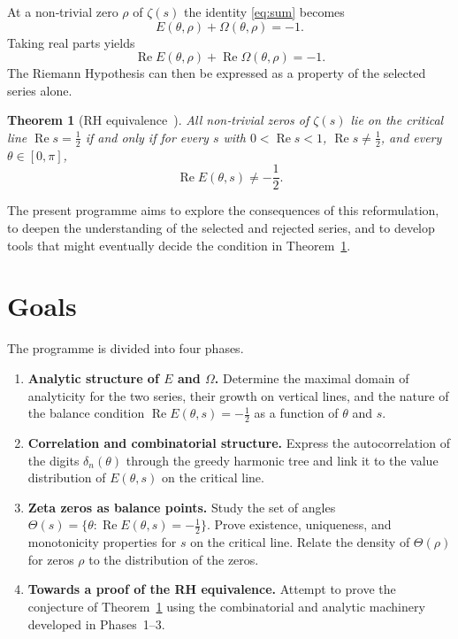 \documentclass[11pt,a4paper]{article}
\newtheorem{theorem}{Theorem}[section]
\theoremstyle{definition}
\theoremstyle{remark}
\begin{document}
At a non‑trivial zero \(\rho\) of \(\zeta(s)\) the identity \eqref{eq:sum} becomes
\[
E(\theta,\rho)+\Omega(\theta,\rho)=-1.
\]
Taking real parts yields
\[
\operatorname{Re}E(\theta,\rho)+\operatorname{Re}\Omega(\theta,\rho)=-1.
\]
The Riemann Hypothesis can then be expressed as a property of the selected series alone.

\begin{theorem}[RH equivalence~\cite{GDSTfound}]\label{thm:RH}
All non‑trivial zeros of \(\zeta(s)\) lie on the critical line \(\operatorname{Re}s=\frac12\) if and only if for every \(s\) with \(0<\operatorname{Re}s<1\), \(\operatorname{Re}s\neq\frac12\), and every \(\theta\in[0,\pi]\),
\[
\operatorname{Re}E(\theta,s)\neq -\frac12.
\]
\end{theorem}

The present programme aims to explore the consequences of this reformulation, to deepen the understanding of the selected and rejected series, and to develop tools that might eventually decide the condition in Theorem~\ref{thm:RH}.

\section{Goals}
The programme is divided into four phases.

\begin{enumerate}[label=\textbf{Phase \arabic*},leftmargin=*]
\item \textbf{Analytic structure of \(E\) and \(\Omega\).}
Determine the maximal domain of analyticity for the two series, their growth on vertical lines, and the nature of the balance condition \(\operatorname{Re}E(\theta,s)=-\frac12\) as a function of \(\theta\) and \(s\).
\item \textbf{Correlation and combinatorial structure.}
Express the autocorrelation of the digits \(\delta_n(\theta)\) through the greedy harmonic tree and link it to the value distribution of \(E(\theta,s)\) on the critical line.
\item \textbf{Zeta zeros as balance points.}
Study the set of angles \(\Theta(s)=\{\theta:\operatorname{Re}E(\theta,s)=-\frac12\}\).
Prove existence, uniqueness, and monotonicity properties for \(s\) on the critical line.
Relate the density of \(\Theta(\rho)\) for zeros \(\rho\) to the distribution of the zeros.
\item \textbf{Towards a proof of the RH equivalence.}
Attempt to prove the conjecture of Theorem~\ref{thm:RH} using the combinatorial and analytic machinery developed in Phases~1--3.
\end{enumerate}
\end{document}
